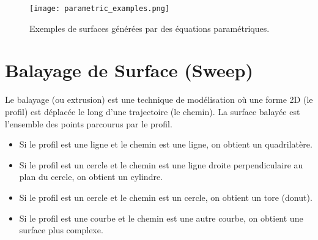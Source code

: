 \documentclass{article}
\begin{document}
\begin{figure}[H]
\centering
\texttt{[image: parametric\_examples.png]}
\caption{Exemples de surfaces générées par des équations paramétriques.}
\label{fig:parametric_examples}
\end{figure}

\section{Balayage de Surface (Sweep)}

Le balayage (ou extrusion) est une technique de modélisation où une forme 2D (le profil) est déplacée le long d'une trajectoire (le chemin). La surface balayée est l'ensemble des points parcourus par le profil.
\begin{itemize}
    \item Si le profil est une ligne et le chemin est une ligne, on obtient un quadrilatère.
    \item Si le profil est un cercle et le chemin est une ligne droite perpendiculaire au plan du cercle, on obtient un cylindre.
    \item Si le profil est un cercle et le chemin est un cercle, on obtient un tore (donut).
    \item Si le profil est une courbe et le chemin est une autre courbe, on obtient une surface plus complexe.
\end{itemize}
\end{document}
